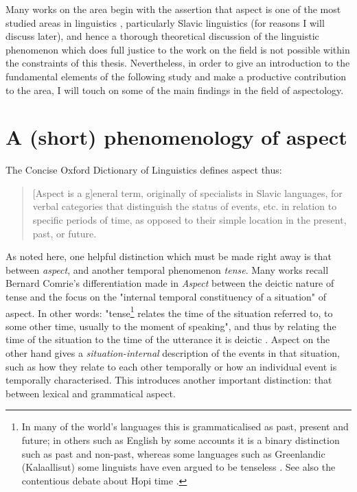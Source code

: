 Many works on the area begin with the assertion that aspect is one of the most studied areas in linguistics \citep{Sasse2002RecentAI}, particularly Slavic linguistics (for reasons I will discuss later), and hence a thorough theoretical discussion of the linguistic phenomenon which does full justice to the work on the field is not possible within the constraints of this thesis. Nevertheless, in order to give an introduction to the fundamental elements of the following study and make a productive contribution to the area, I will touch on some of the main findings in the field of aspectology.
\section{A (short) phenomenology of aspect}
The Concise Oxford Dictionary of Linguistics \citep{matthews2014concise} defines aspect thus: 

\begin{quotation}
    [Aspect is a g]eneral term, originally of specialists in Slavic languages, for verbal categories that distinguish the status of events, etc. in relation to specific periods of time, as opposed to their simple location in the present, past, or future.
\end{quotation}

As noted here, one helpful distinction which must be made right away is that between \emph{aspect}, and another temporal phenomenon \emph{tense}. Many works recall Bernard Comrie's differentiation made in \emph{Aspect} \citep{comrie1976aspect} between the deictic nature of tense and the focus on the "internal temporal constituency of a situation" of aspect. In other words: "tense\footnote{In many of the world's languages this is grammaticalised as past, present and future; in others such as English by some accounts \citep{jespersen2013essentials} it is a binary distinction such as past and non-past, whereas some languages such as Greenlandic (Kalaallisut) some linguists have even argued to be tenseless \citet{10.1093/jos/ffh029}. See also the contentious debate about Hopi time \citet{whorf-writings, hopitime}. } relates the time of the situation referred to, to some other time, usually to the moment of speaking", and thus by relating the time of the situation to the time of the utterance it is deictic \citep{comrie1976aspect}. Aspect on the other hand gives a \emph{situation-internal} description of the events in that situation, such as how they relate to each other temporally or how an individual event is temporally characterised. This introduces another important distinction: that between lexical and grammatical aspect.

